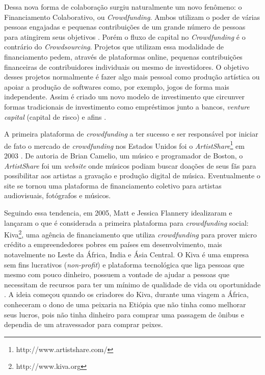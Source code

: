 Dessa nova forma de colaboração surgiu naturalmente um novo fenômeno: o Financiamento Colaborativo, ou \emph{Crowdfunding}. Ambos utilizam o poder de várias pessoas engajadas e pequenas contribuições de um grande número de pessoas para atingirem seus objetivos \cite{crowdfunding-culture}. Porém o fluxo de capital no \emph{Crowdfunding} é o contrário do \emph{Crowdsourcing}. Projetos que utilizam essa modalidade de financiamento pedem, através de plataformas online, pequenas contribuições financeiras de contribuidores individuais ou mesmo de investidores. O objetivo desses projetos normalmente é fazer algo mais pessoal como produção artística ou apoiar a produção de softwares como, por exemplo, jogos de forma mais independente. Assim é criado um novo modelo de investimento que circunver formas tradicionais de investimento como empréstimos junto a bancos, \emph{venture capital} (capital de risco) e afins \cite{belleflamme2010}.

A primeira plataforma de \emph{crowdfunding} a ter sucesso e ser responsável por iniciar de fato o mercado de \emph{crowdfunding} nos Estados Unidos foi o \emph{ArtistShare}\footnote{http://www.artistshare.com/} em 2003 \cite{freedman2015brief}. De autoria de Brian Camelio, um músico e programador de Boston, o \emph{ArtistShare} foi um \emph{website} onde músicos podiam buscar doações de seus fãs para possibilitar aos artistas a gravação e produção digital de música. Eventualmente o site se tornou uma plataforma de financiamento coletivo para artistas audiovisuais, fotógrafos e músicos.

Seguindo essa tendencia, em 2005, Matt e Jessica Flannery idealizaram e lançaram o que é considerada a primeira plataforma para \emph{crowdfunding} social: Kiva\footnote{http://www.kiva.org}, uma agência de financiamento que utiliza \emph{crowdfunding} para prover micro crédito a empreendedores pobres em países em desenvolvimento, mais notavelmente no Leste da África, India e Ásia Central. O Kiva é uma empresa sem fins lucrativos (\emph{non-profit}) e plataforma tecnológica que liga pessoas que mesmo com pouco dinheiro, possuem a vontade de ajudar a pessoas que necessitam de recursos para ter um mínimo de qualidade de vida ou oportunidade \cite{flannery2007kiva}. A ideia começou quando os criadores do Kiva, durante uma viagem a África, conheceram o dono de uma peixaria na Etiópia que não tinha como melhorar seus lucros, pois não tinha dinheiro para comprar uma passagem de ônibus e dependia de um atravessador para comprar peixes.

